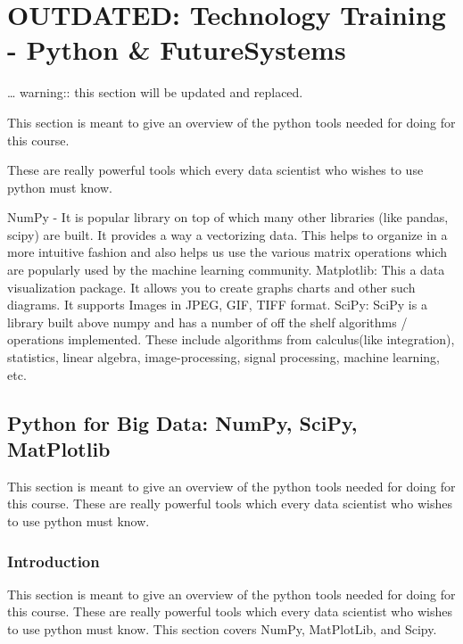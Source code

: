 \begin{fileremark}\currfiledir \currfilename\end{fileremark}

\section{OUTDATED: Technology Training - Python \&
FutureSystems}\label{outdated-technology-training---python-futuresystems}

\ldots{} warning:: this section will be updated and replaced.

This section is meant to give an overview of the python tools needed for
doing for this course.

These are really powerful tools which every data scientist who wishes to
use python must know.

NumPy - It is popular library on top of which many other libraries (like
pandas, scipy) are built. It provides a way a vectorizing data. This
helps to organize in a more intuitive fashion and also helps us use the
various matrix operations which are popularly used by the machine
learning community. Matplotlib: This a data visualization package. It
allows you to create graphs charts and other such diagrams. It supports
Images in JPEG, GIF, TIFF format. SciPy: SciPy is a library built above
numpy and has a number of off the shelf algorithms / operations
implemented. These include algorithms from calculus(like integration),
statistics, linear algebra, image-processing, signal processing, machine
learning, etc.

\subsection{Python for Big Data: NumPy, SciPy,
MatPlotlib}\label{python-for-big-data-numpy-scipy-matplotlib}

This section is meant to give an overview of the python tools needed for
doing for this course. These are really powerful tools which every data
scientist who wishes to use python must know.

\subsubsection{Introduction}\label{introduction}

This section is meant to give an overview of the python tools needed for
doing for this course. These are really powerful tools which every data
scientist who wishes to use python must know. This section covers NumPy,
MatPlotLib, and Scipy.

